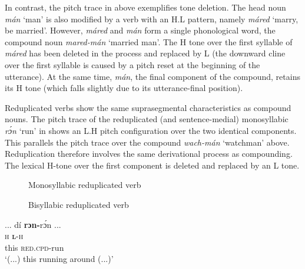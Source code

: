 In contrast, the pitch trace in  above exemplifies tone deletion. The head noun \textit{mán} ‘man’ is also modified by a verb with an H.L pattern, namely \textit{máred} ‘marry, be married’. However, \textit{máred} and \textit{mán} form a single phonological word, the compound noun \textit{mared-mán} ‘married man’. The H tone over the first syllable of \textit{máred} has been deleted in the process and replaced by L (the downward cline over the first syllable is caused by a pitch reset at the beginning of the utterance). At the same time, \textit{mán}, the final component of the compound, retains its H tone (which falls slightly due to its utterance-final position).

Reduplicated verbs show the same suprasegmental characteristics as compound nouns. The pitch trace of the reduplicated (and sentence-medial) monosyllabic \textit{rɔ́n} ‘run’ in  shows an L.H pitch configuration over the two identical components. This parallels the pitch trace over the compound \textit{wach-mán} ‘watchman’ above. Reduplication therefore involves the same derivational process as compounding. The lexical H-tone over the first component is deleted and replaced by an L tone.


\begin{figure}
\caption{Monosyllabic reduplicated verb}
\label{fig:key:3.21}
\end{figure}

\begin{figure}
\caption{Bisyllabic reduplicated verb}
\label{fig:key:3.22} 
\end{figure}
 
\ea%
    \label{ex:key:60}
    \glll  \op...\cp{}  dí  \textbf{rɔn-}rɔ́n \op...\cp\\
{} \textsc{h}  \textbf{\textsc{l}}\textsc{{}-h}\\
{} this  \textsc{red.cpd-}run\\
\glt ‘(...) this running around (...)’
\z

